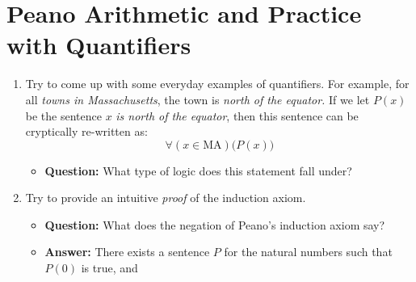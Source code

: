 \documentclass{article}
\newif\ifsolution
\begin{document}
    \section{Peano Arithmetic and Practice with Quantifiers}
        \begin{enumerate}
            \item
                Try to come up with some everyday examples of quantifiers. For
                example, for all \textit{towns in Massachusetts}, the town is
                \textit{north of the equator.} If we let $P(x)$ be the
                sentence $x$ \textit{is north of the equator},
                then this sentence can be cryptically re-written as:
                \[
                    \forall(x\in\textrm{MA})\big(P(x)\big)
                \]
                \begin{itemize}
                    \item
                        \textbf{Question:}
                        What type of logic does this statement fall under?
                        \ifsolution
                            \color{blue}
                            \item
                                \textbf{Answer}:
                                First order logic. We are quantifying
                                over \textit{things} (towns in Massachusetts),
                                but not \textit{properties about things}.
                                There is a property under consideration
                                (being north of the equator), but it is
                                \textit{fixed} and not being quantified over.
                            \color{black}
                        \fi
                \end{itemize}
            \item
                Try to provide an intuitive \textit{proof}
                of the induction axiom.
                \begin{itemize}
                    \item
                        \textbf{Question:}
                        What does the negation of Peano's induction axiom say?
                        \ifsolution
                            \color{blue}
                            \item
                                \textbf{Answer:}
                                There exists a sentence $P$ for the natural
                                numbers such that $P(0)$ is true, and

\end{itemize}
\end{enumerate}
\end{document}
